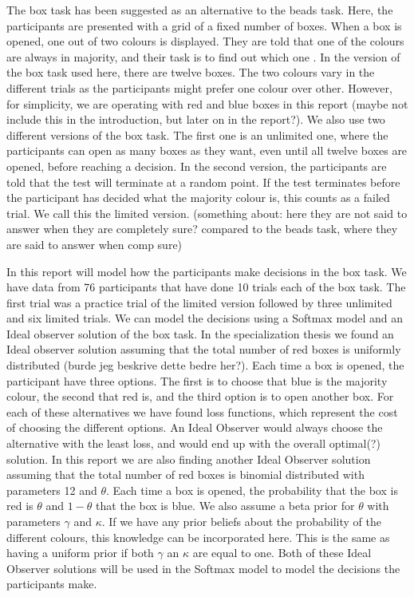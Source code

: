 The box task has been suggested as an alternative to the beads task. Here, the participants are presented with a grid of a fixed number of boxes. When a box is opened, one out of two colours is displayed. They are told that one of the colours are always in majority, and their task is to find out which one \citep{moritz2017}. In the version of the box task used here, there are twelve boxes. The two colours vary in the different trials as the participants might prefer one colour over other. However, for simplicity, we are operating with red and blue boxes in this report (maybe not include this in the introduction, but later on in the report?). We also use two different versions of the box task. The first one is an unlimited one, where the participants can open as many boxes as they want, even until all twelve boxes are opened, before reaching a decision. In the second version, the participants are told that the test will terminate at a random point. If the test terminates before the participant has decided what the majority colour is, this counts as a failed trial. We call this the limited version. (something about: here they are not said to answer when they are completely sure? compared to the beads task, where they are said to answer when comp sure)

In this report will model how the participants make decisions in the box task. We have data from 76 participants that have done 10 trials each of the box task. The first trial was a practice trial of the limited version followed by three unlimited and six limited trials. We can model the decisions using a Softmax model and an Ideal observer solution of the box task. 
In the specialization thesis we found an Ideal observer solution assuming that the total number of red boxes is uniformly distributed (burde jeg beskrive dette bedre her?). Each time a box is opened, the participant have three options. The first is to choose that blue is the majority colour, the second that red is, and the third option is to open another box. For each of these alternatives we have found loss functions, which represent the cost of choosing the different options. An Ideal Observer would always choose the alternative with the least loss, and would end up with the overall optimal(?) solution. 
In this report we are also finding another Ideal Observer solution assuming that the total number of red boxes is binomial distributed with parameters 12 and $\theta$. Each time a box is opened, the probability that the box is red is $\theta$ and $1-\theta$ that the box is blue. We also assume a beta prior for $\theta$ with parameters $\gamma$ and $\kappa$. If we have any prior beliefs about the probability of the different colours, this knowledge can be incorporated here. This is the same as having a uniform prior if both $\gamma$ an $\kappa$ are equal to one. 
Both of these Ideal Observer solutions will be used in the Softmax model to model the decisions the participants make. 


